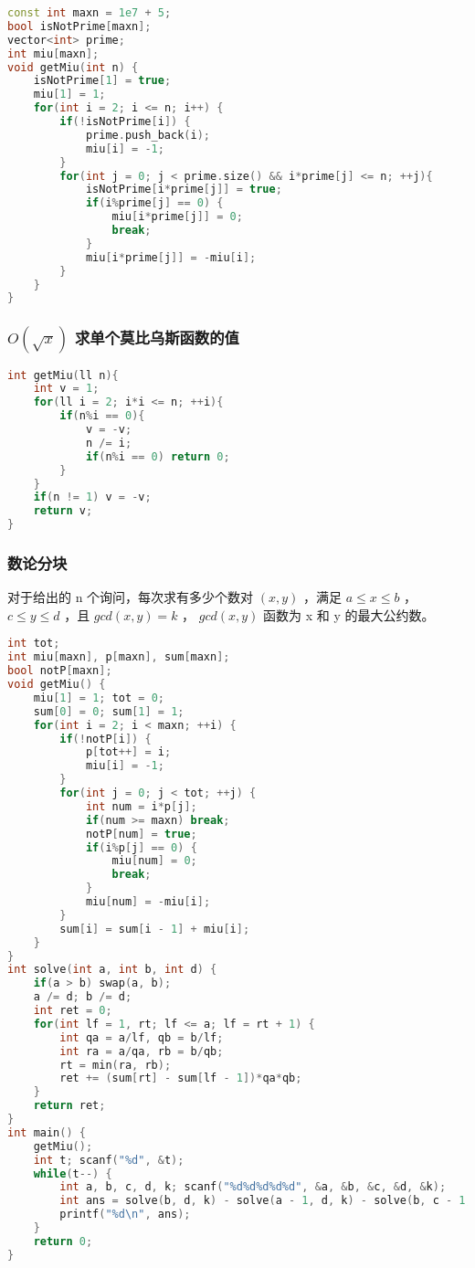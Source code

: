 \begin{lstlisting}[language=C++]
const int maxn = 1e7 + 5;
bool isNotPrime[maxn];
vector<int> prime;
int miu[maxn];
void getMiu(int n) {
    isNotPrime[1] = true;
    miu[1] = 1;
    for(int i = 2; i <= n; i++) {
        if(!isNotPrime[i]) {
            prime.push_back(i);
            miu[i] = -1;
        }
        for(int j = 0; j < prime.size() && i*prime[j] <= n; ++j){
            isNotPrime[i*prime[j]] = true;
            if(i%prime[j] == 0) {
                miu[i*prime[j]] = 0;
                break;
            }
            miu[i*prime[j]] = -miu[i];
        }
    }
}
\end{lstlisting}

\subsubsection{$O(\sqrt{x})$ 求单个莫比乌斯函数的值}

\begin{lstlisting}[language=C++]
int getMiu(ll n){
    int v = 1;
    for(ll i = 2; i*i <= n; ++i){
        if(n%i == 0){
            v = -v;
            n /= i;
            if(n%i == 0) return 0;
        }
    }
    if(n != 1) v = -v;
    return v;
}
\end{lstlisting}

\subsubsection{数论分块}

对于给出的 n 个询问，每次求有多少个数对 $(x, y)$ ，满足 $a \le x \le b$ ， $c \le y \le d$ ，且 $gcd(x, y) = k$ ， $gcd(x, y)$ 函数为 x 和 y 的最大公约数。

\begin{lstlisting}[language=C++]
int tot;
int miu[maxn], p[maxn], sum[maxn];
bool notP[maxn];
void getMiu() {
    miu[1] = 1; tot = 0;
    sum[0] = 0; sum[1] = 1;
    for(int i = 2; i < maxn; ++i) {
        if(!notP[i]) {
            p[tot++] = i;
            miu[i] = -1;
        }
        for(int j = 0; j < tot; ++j) {
            int num = i*p[j];
            if(num >= maxn) break;
            notP[num] = true;
            if(i%p[j] == 0) {
                miu[num] = 0;
                break;
            }
            miu[num] = -miu[i];
        }
        sum[i] = sum[i - 1] + miu[i];
    }
}
int solve(int a, int b, int d) {
    if(a > b) swap(a, b);
    a /= d; b /= d;
    int ret = 0;
    for(int lf = 1, rt; lf <= a; lf = rt + 1) {
        int qa = a/lf, qb = b/lf;
        int ra = a/qa, rb = b/qb;
        rt = min(ra, rb);
        ret += (sum[rt] - sum[lf - 1])*qa*qb;
    }
    return ret;
}
int main() {
    getMiu();
    int t; scanf("%d", &t);
    while(t--) {
        int a, b, c, d, k; scanf("%d%d%d%d%d", &a, &b, &c, &d, &k);
        int ans = solve(b, d, k) - solve(a - 1, d, k) - solve(b, c - 1, k) + solve(a - 1, c - 1, k);
        printf("%d\n", ans);
    }
    return 0;
}
\end{lstlisting}

